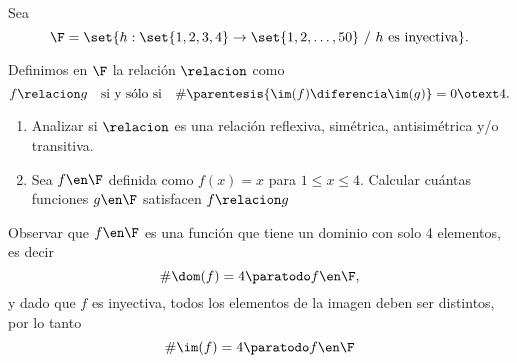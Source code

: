 \begin{enunciado}{\ejExtra}
  Sea
  $$
    \F = \set{h : \set{1,2,3,4} \to \set{1,2,\dots, 50} \ /\  h \text{ es inyectiva}}. $$

  Definimos en $\F$ la relación $\relacion$ como
  $$
    f \relacion g \quad \text{si y sólo si} \quad \# \parentesis{ \im(f) \diferencia \im(g) } = 0 \otext 4.
  $$
  \begin{enumerate}[label=\alph*)]
    \item Analizar si $\relacion$ es una relación reflexiva, simétrica, antisimétrica y/o transitiva.

    \item Sea
          $f \en \F$
          definida como $f(x) = x$ para $1 \leq x \leq 4$. Calcular cuántas funciones $g \en \F$
          satisfacen $f \relacion g$
  \end{enumerate}
\end{enunciado}

Observar que $f \en \F$ es una función que tiene un dominio con solo 4 elementos, es decir
$$
  \# \dom(f) = 4 \paratodo f \en \F,
$$
y dado que $f$ es inyectiva, todos los elementos de la imagen deben ser distintos, por lo tanto
$$
  \# \im(f) = 4 \paratodo f \en \F
$$

